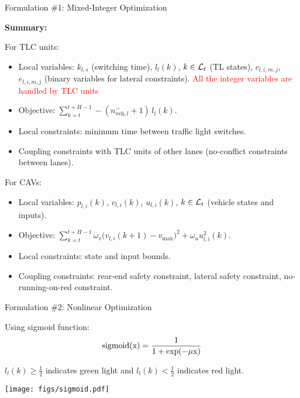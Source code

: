 \documentclass[9pt]{beamer}
\begin{document}
\begin{frame}{Formulation \#1: Mixed-Integer Optimization}

\textbf{Summary:}

For TLC units:
\begin{itemize}
\item Local variables: $k_{l,s}$ (switching time), $l_l (k)$, $k \in \mathcal{L}_t$ (TL states), $c_{l,i,m,j}$, $e_{l,i,m,j}$ (binary variables for lateral constraints). \textcolor{red}{All the integer variables are handled by TLC units}

\item Objective: $\sum_{k = t}^{t+H-1} - (n_{\text{veh},l}^{-} + 1)\, l_l(k)$.

\item Local constraints: minimum time between traffic light switches.

\item Coupling constraints with TLC units of other lanes (no-conflict constraints between lanes).

\end{itemize}

For CAVs:
\begin{itemize}
\item Local variables: $p_{l,i}(k)$, $v_{l,i}(k)$, $u_{l,i}(k)$, $k \in \mathcal{L}_t$ (vehicle states and inputs). 

\item Objective: $\sum_{k = t}^{t+H-1} \omega_v \big( v_{l,i} (k+1) - v_{\max} \big)^2 + \omega_u u^2_{l,i} (k)$.

\item Local constraints: state and input bounds.

\item Coupling constraints: rear-end safety constraint, lateral safety constraint, no-running-on-red constraint.

\end{itemize}

\end{frame}






\begin{frame}{Formulation \#2: Nonlinear Optimization}

Using sigmoid function:
\[
\rm{sigmoid} (x) = \frac{1}{1+exp(-\mu x)}
\]

$l_l (k) \ge \frac{1}{2}$ indicates green light and $l_l (k) < \frac{1}{2}$ indicates red light. 


\centering \texttt{[image: figs/sigmoid.pdf]}
\end{frame}
\end{document}
